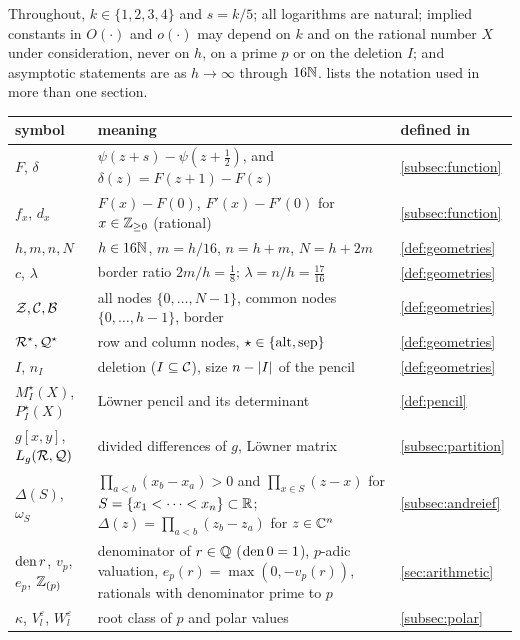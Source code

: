 Throughout, $k\in\{1,2,3,4\}$ and $s=k/5$; all logarithms are natural; implied constants in
$O(\cdot)$ and $o(\cdot)$ may depend on $k$ and on the rational number $X$ under consideration,
never on $h$, on a prime $p$ or on the deletion $I$; and asymptotic statements are as
$h\to\infty$ through $16\mathbb{N}$.  lists the notation used in more than one section.

\begin{table}[ht]
\centering
\small
\begin{tabular}{@{}>{\raggedright\arraybackslash}p{}>{\raggedright\arraybackslash}p{}>{\raggedright\arraybackslash}p{}@{}}
\toprule
symbol & meaning & defined in\\
\midrule
$F$, $\delta$ & $\psi(z+s)-\psi(z+\frac12)$, and $\delta(z)=F(z+1)-F(z)$ & \cref{subsec:function}\\
$f_x$, $d_x$ & $F(x)-F(0)$, $F'(x)-F'(0)$ for $x\in\mathbb{Z}_{\ge0}$ (rational) & \cref{subsec:function}\\
$h,m,n,N$ & $h\in16\mathbb{N}$, $m=h/16$, $n=h+m$, $N=h+2m$ & \cref{def:geometries}\\
$c$, $\lambda$ & border ratio $2m/h=\frac18$; $\lambda=n/h=\frac{17}{16}$ & \cref{def:geometries}\\
$\mathcal{Z},\mathcal{C},\mathcal{B}$ & all nodes $\{0,\dots,N-1\}$, common nodes $\{0,\dots,h-1\}$, border & \cref{def:geometries}\\
$\mathcal{R}^\star,\mathcal{Q}^\star$ & row and column nodes, $\star\in\{\mathrm{alt},\mathrm{sep}\}$ & \cref{def:geometries}\\
$I$, $n_I$ & deletion ($I\subseteq\mathcal{C}$), size $n-\lvert I\rvert$ of the pencil & \cref{def:geometries}\\
$M^\star_I(X)$, $P^\star_I(X)$ & L\"owner pencil and its determinant & \cref{def:pencil}\\
$g[x,y]$, $L_g(\mathcal{R},\mathcal{Q})$ & divided differences of $g$, L\"owner matrix & \cref{subsec:partition}\\
$\Delta(S)$, $\omega_S$ & $\prod_{a<b}(x_b-x_a)>0$ and $\prod_{x\in S}(z-x)$ for $S=\{x_1<\dots<x_n\}\subset\mathbb{R}$; $\Delta(z)=\prod_{a<b}(z_b-z_a)$ for $z\in\mathbb{C}^n$ & \cref{subsec:andreief}\\
$\operatorname{den} r$, $v_p$, $e_p$, $\mathbb{Z}_{(p)}$ & denominator of $r\in\mathbb{Q}$ ($\operatorname{den}0=1$), $p$-adic valuation, $e_p(r)=\max(0,-v_p(r))$, rationals with denominator prime to $p$ & \cref{sec:arithmetic}\\
$\kappa$, $V^\varepsilon_l$, $W^\varepsilon_l$ & root class of $p$ and polar values & \cref{subsec:polar}\\

\end{tabular}
\end{table}
